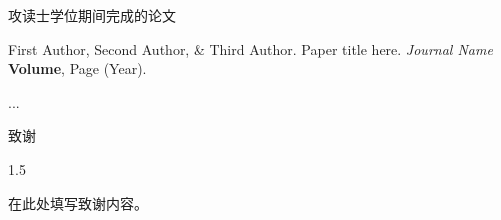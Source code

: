 \documentclass[../main.tex]{subfiles}
\begin{document}
\cleardoublepage
\begin{center}
	{\heiti {} 攻读\youreduction 士学位期间完成的论文}
\end{center}
\vspace{0.1cm}
\songti {}

{
	\begin{enumerate}[label=\textbf{[\arabic*]}]
		\item First Author, Second Author, \& Third Author.
			Paper title here.
			\textit{Journal Name} \textbf{Volume}, Page (Year).
		\item ...
	\end{enumerate}
}

\cleardoublepage
\begin{center}
	{\heiti {} 致\hspace{2em}谢}
\end{center}
\vspace{0.5cm}

\begin{spacing}{1.5}
	\songti {}

	在此处填写致谢内容。

	\rightline{\yourtitledate}
\end{spacing}

\cleardoublepage
{}
\thispagestyle{empty}
\end{document}

